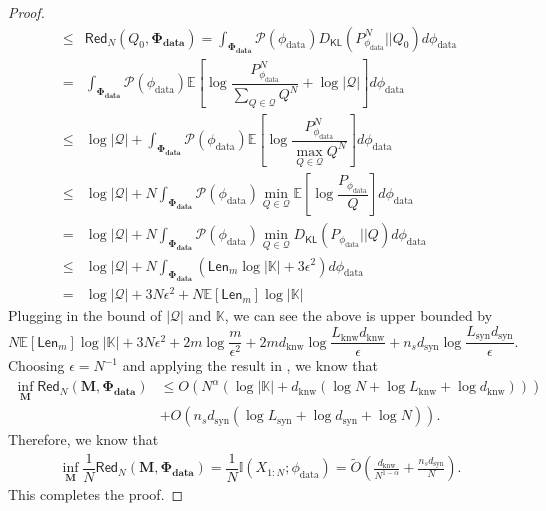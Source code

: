 \documentclass[11pt]{article}
\theoremstyle{plain}
\theoremstyle{definition}
\newcommand{\DKL}{D_{\mathsf{KL}}}
\newcommand{\redundency}{\mathsf{Red}}
\newcommand{\Model}{\boldsymbol{M}}
\newcommand{\dataModel}{\phi_{\text{data}}}
\newcommand{\knwModel}{\phi_{\text{knw}}}
\newcommand{\knwfamily}{\mathbf{\Phi_{\text{knw}}}}
\newcommand{\datafamily}{\mathbf{\Phi_{\text{data}}}}
\newcommand{\knwdimension}{d_{\text{knw}}}
\newcommand{\syndimension}{d_{\text{syn}}}
\newcommand{\knwLip}{L_{\text{knw}}}
\newcommand{\synLip}{L_{\text{syn}}}
\newcommand{\knwset}{\mathbb{K}}
\newcommand{\Len}{\mathsf{Len}}
\begin{document}
\begin{proof}
\begin{align*}
   \le & \redundency_N(Q_0,\datafamily)
   =\int_{\datafamily} \mathcal{P}(\dataModel)\DKL(P^N_{\dataModel}||Q_0) d\dataModel \\ =& \int_{\datafamily} \mathcal{P}(\dataModel)\mathbb{E}\left[\log \dfrac{ P^N_{\dataModel}}{\sum\limits_{Q\in \mathcal{Q}}Q^N}+\log |\mathcal{Q}|\right]  d\dataModel 
    \\ \le& \log |\mathcal{Q}|+ \int_{\datafamily} \mathcal{P}(\dataModel)\mathbb{E}\left[\log \dfrac{ P_{\dataModel}^N}{\max\limits_{Q\in \mathcal{Q}} 
    Q^N}\right]d\dataModel
    \\ \le& \log |\mathcal{Q}|+ N\int_{\datafamily} \mathcal{P}(\dataModel)\min_{Q\in \mathcal{Q}}\mathbb{E}\left[\log \dfrac{ P_{\dataModel}}{
    Q}\right]d\dataModel
    \\ =& \log |\mathcal{Q}|+ N\int_{\datafamily} \mathcal{P}(\dataModel)\min_{Q\in \mathcal{Q}}\DKL(P_{\dataModel}||Q)d\dataModel
    \\ \le & \log |\mathcal{Q}|+ N\int_{\datafamily} (\Len_m\log|\mathbb{K}|+3\epsilon^2) d\dataModel
    \\ = & \log |\mathcal{Q}|+ 3N\epsilon^2 + N\mathbb{E}[\Len_m]\log |\mathbb{K}|
\end{align*}
Plugging in the bound of $|\mathcal{Q}|$
and $\mathbb{K}$, we can see the above is 
upper bounded by
\[N\mathbb{E}[\Len_m]\log |\mathbb{K}| + 3N\epsilon^2 +  2m\log \dfrac{m}{\epsilon^2}+2m\knwdimension\log\dfrac{\knwLip\knwdimension}{\epsilon}+n_s\syndimension\log\dfrac{\synLip\syndimension}{\epsilon}.
\]
Choosing $\epsilon=N^{-1}$ and applying the result in , we know that 
\begin{align*}
    \inf_{\Model} \redundency_N(\Model,\datafamily)&\le O(N^{\alpha}(\log |\knwset|+\knwdimension(\log N+\log \knwLip+\log \knwdimension)))
\\ &+O(n_s\syndimension(\log \synLip+\log \syndimension+\log N)).
\end{align*}
Therefore, we know that 
\begin{align*}
    \inf_{\Model}\dfrac{1}{N}\redundency_N(\Model,\datafamily)=\dfrac{1}{N}\mathbb{I}(X_{1:N}; \dataModel) = 
    \widetilde{O}\left(\frac{\knwdimension}{N^{1-\alpha}}+\frac{ n_s\syndimension}{N}\right).
\end{align*}
This completes the proof.
\end{proof}
\end{document}
